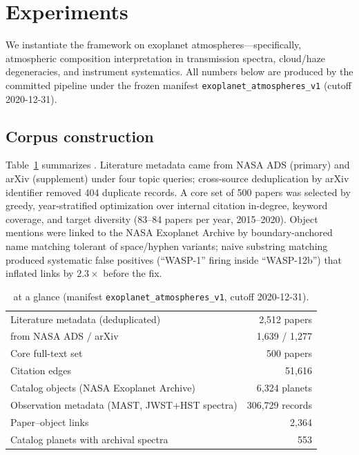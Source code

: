 \section{Experiments}
\label{sec:experiments}

We instantiate the framework on exoplanet atmospheres---specifically,
atmospheric composition interpretation in transmission spectra,
cloud/haze degeneracies, and instrument systematics. All numbers below
are produced by the committed pipeline under the frozen manifest
\texttt{exoplanet\_atmospheres\_v1} (cutoff 2020-12-31).

\subsection{Corpus construction}
\label{sec:experiments:corpus}

Table~\ref{tab:corpus} summarizes \corpusA{}. Literature metadata came
from NASA ADS (primary) and arXiv (supplement) under four topic queries;
cross-source deduplication by arXiv identifier removed 404 duplicate
records. A core set of 500 papers was selected by greedy,
year-stratified optimization over internal citation in-degree, keyword
coverage, and target diversity (83--84 papers per year, 2015--2020).
Object mentions were linked to the NASA Exoplanet Archive by
boundary-anchored name matching tolerant of space/hyphen variants;
naive substring matching produced systematic false positives
(``WASP-1'' firing inside ``WASP-12b'') that inflated links by
$2.3\times$ before the fix.

\begin{table}[t]
  \centering
  \caption{\corpusA{} at a glance (manifest
  \texttt{exoplanet\_atmospheres\_v1}, cutoff 2020-12-31).}
  \label{tab:corpus}
  \begin{tabular}{lr}
    \toprule
    Literature metadata (deduplicated) & 2{,}512 papers \\
    \quad from NASA ADS / arXiv & 1{,}639 / 1{,}277 \\
    Core full-text set & 500 papers \\
    Citation edges & 51{,}616 \\
    Catalog objects (NASA Exoplanet Archive) & 6{,}324 planets \\
    Observation metadata (MAST, JWST+HST spectra) & 306{,}729 records \\
    Paper--object links & 2{,}364 \\
    Catalog planets with archival spectra & 553 \\
    \bottomrule
  \end{tabular}
\end{table}

